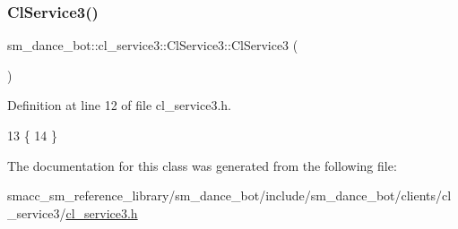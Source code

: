 \subsubsection{\texorpdfstring{Cl\+Service3()}{ClService3()}}
{\footnotesize\ttfamily sm\+\_\+dance\+\_\+bot\+::cl\+\_\+service3\+::\+Cl\+Service3\+::\+Cl\+Service3 (\begin{DoxyParamCaption}{ }\end{DoxyParamCaption})\hspace{0.3cm}{\ttfamily [inline]}}



Definition at line 12 of file cl\+\_\+service3.\+h.


\begin{DoxyCode}
13   \{
14   \}
\end{DoxyCode}


The documentation for this class was generated from the following file\+:\begin{DoxyCompactItemize}
\item 
smacc\+\_\+sm\+\_\+reference\+\_\+library/sm\+\_\+dance\+\_\+bot/include/sm\+\_\+dance\+\_\+bot/clients/cl\+\_\+service3/\hyperlink{sm__dance__bot_2include_2sm__dance__bot_2clients_2cl__service3_2cl__service3_8h}{cl\+\_\+service3.\+h}\end{DoxyCompactItemize}
